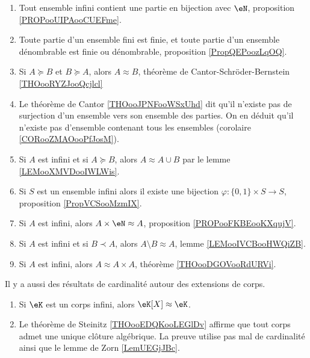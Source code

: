 \begin{enumerate}
	\item
	      Tout ensemble infini contient une partie en bijection avec \( \eN\), proposition \ref{PROPooUIPAooCUEFme}.
	\item
	      Toute partie d'un ensemble fini est finie, et toute partie d'un ensemble dénombrable est finie ou dénombrable, proposition \ref{PropQEPoozLqOQ}.
	\item
	      Si \( A\succeq B\) et \( B\succeq A\), alors \( A\approx B\), théorème de Cantor-Schröder-Bernstein \ref{THOooRYZJooQcjlcl}
	\item
	      Le théorème de Cantor \ref{THOooJPNFooWSxUhd} dit qu'il n'existe pas de surjection d'un ensemble vers son ensemble des parties. On en déduit qu'il n'existe pas d'ensemble contenant tous les ensembles (corolaire \ref{CORooZMAOooPfJosM}).
	\item
	      Si \( A\) est infini et si \( A\succeq B\), alors \( A\approx A\cup B\) par le lemme \ref{LEMooXMVDooIWLWis}.
	\item
	      Si \( S\) est un ensemble infini alors il existe une bijection \( \varphi\colon \{ 0,1 \}\times S\to S\), proposition \ref{PropVCSooMzmIX}.
	\item
	      Si \( A\) est infini, alors \( A\times \eN\approx A\), proposition \ref{PROPooFKBEooKXqujV}.
	\item
	      Si \( A\) est infini et si \( B\prec A\), alors \( A\setminus B\approx A\), lemme \ref{LEMooIVCBooHWQiZB}.
	\item
	      Si \( A\) est infini, alors \( A\approx A\times A\), théorème \ref{THOooDGOVooRdURVi}.
\end{enumerate}

Il y a aussi des résultats de cardinalité autour des extensions de corps.
\begin{enumerate}
	\item
	      Si \( \eK\) est un corps infini, alors \( \eK[X]\approx \eK\).
	\item
	      Le théorème de Steinitz \ref{THOooEDQKooLEGlDv} affirme que tout corps admet une unique clôture algébrique. La preuve utilise pas mal de cardinalité ainsi que le lemme de Zorn \ref{LemUEGjJBc}.
\end{enumerate}
